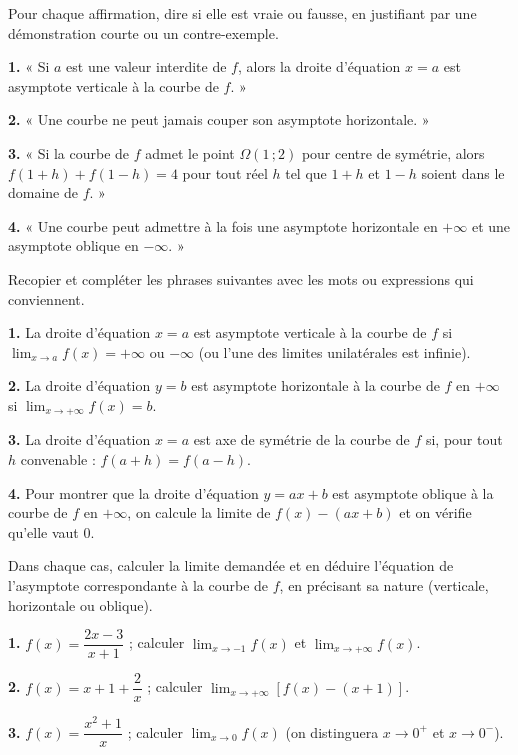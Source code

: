 \documentclass[11pt]{article}
\newcommand{\cle}[1]{{\popxbold\color{popdark}#1}}
\begin{document}
\begin{exercice}
Pour chaque affirmation, dire si elle est vraie ou fausse, en justifiant par une démonstration courte ou un contre-exemple.

\textbf{1.} « Si $a$ est une valeur interdite de $f$, alors la droite d'équation $x=a$ est asymptote verticale à la courbe de $f$. »

\textbf{2.} « Une courbe ne peut jamais couper son asymptote horizontale. »

\textbf{3.} « Si la courbe de $f$ admet le point $\Omega(1\,;2)$ pour centre de symétrie, alors $f(1+h)+f(1-h)=4$ pour tout réel $h$ tel que $1+h$ et $1-h$ soient dans le domaine de $f$. »

\textbf{4.} « Une courbe peut admettre à la fois une asymptote horizontale en $+\infty$ et une asymptote oblique en $-\infty$. »
\end{exercice}

\begin{exercice}
Recopier et compléter les phrases suivantes avec les mots ou expressions qui conviennent.

\textbf{1.} La droite d'équation $x=a$ est \cle{asymptote verticale} à la courbe de $f$ si $\displaystyle\lim_{x\to a}f(x)=+\infty$ ou $-\infty$ (ou l'une des limites unilatérales est infinie).

\textbf{2.} La droite d'équation $y=b$ est \cle{asymptote horizontale} à la courbe de $f$ en $+\infty$ si $\displaystyle\lim_{x\to+\infty}f(x)=b$.

\textbf{3.} La droite d'équation $x=a$ est \cle{axe de symétrie} de la courbe de $f$ si, pour tout $h$ convenable : $f(a+h)=f(a-h)$.

\textbf{4.} Pour montrer que la droite d'équation $y=ax+b$ est asymptote oblique à la courbe de $f$ en $+\infty$, on calcule la limite de $f(x)-(ax+b)$ et on vérifie qu'elle vaut $0$.
\end{exercice}

\begin{exercice}
Dans chaque cas, calculer la limite demandée et en déduire l'équation de l'asymptote correspondante à la courbe de $f$, en précisant sa nature (verticale, horizontale ou oblique).

\textbf{1.} $f(x)=\dfrac{2x-3}{x+1}$ ; calculer $\displaystyle\lim_{x\to -1}f(x)$ et $\displaystyle\lim_{x\to +\infty}f(x)$.

\textbf{2.} $f(x)=x+1+\dfrac{2}{x}$ ; calculer $\displaystyle\lim_{x\to +\infty}[f(x)-(x+1)]$.

\textbf{3.} $f(x)=\dfrac{x^2+1}{x}$ ; calculer $\displaystyle\lim_{x\to 0}f(x)$ (on distinguera $x\to 0^+$ et $x\to 0^-$).
\end{exercice}
\end{document}
